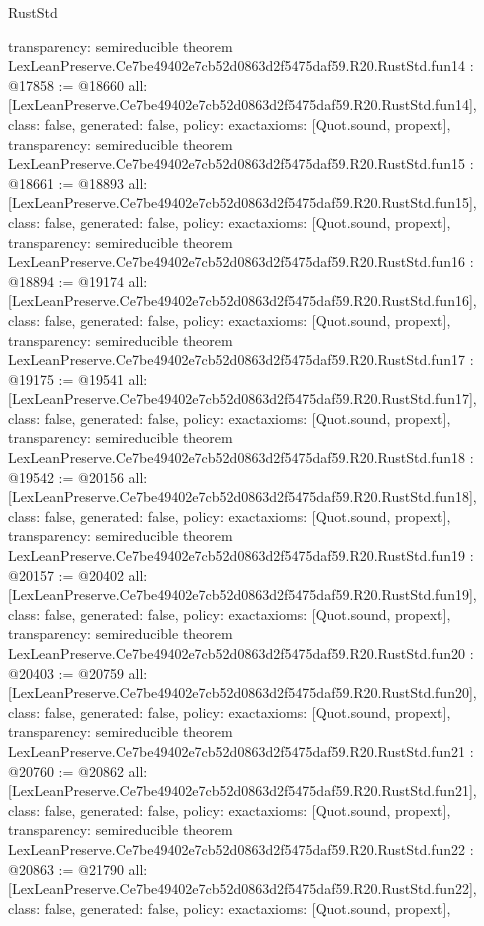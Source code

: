 \begin{lexlean}{RustStd}
\begin{coremodule}
{  transparency: semireducible
}
theorem LexLeanPreserve.Ce7be49402e7cb52d0863d2f5475daf59.R20.RustStd.fun14 : @17858 := @18660 {
  all: [LexLeanPreserve.Ce7be49402e7cb52d0863d2f5475daf59.R20.RustStd.fun14],
  class: false,
  generated: false,
  policy: exact{axioms: [Quot.sound, propext]},
  transparency: semireducible
}
theorem LexLeanPreserve.Ce7be49402e7cb52d0863d2f5475daf59.R20.RustStd.fun15 : @18661 := @18893 {
  all: [LexLeanPreserve.Ce7be49402e7cb52d0863d2f5475daf59.R20.RustStd.fun15],
  class: false,
  generated: false,
  policy: exact{axioms: [Quot.sound, propext]},
  transparency: semireducible
}
theorem LexLeanPreserve.Ce7be49402e7cb52d0863d2f5475daf59.R20.RustStd.fun16 : @18894 := @19174 {
  all: [LexLeanPreserve.Ce7be49402e7cb52d0863d2f5475daf59.R20.RustStd.fun16],
  class: false,
  generated: false,
  policy: exact{axioms: [Quot.sound, propext]},
  transparency: semireducible
}
theorem LexLeanPreserve.Ce7be49402e7cb52d0863d2f5475daf59.R20.RustStd.fun17 : @19175 := @19541 {
  all: [LexLeanPreserve.Ce7be49402e7cb52d0863d2f5475daf59.R20.RustStd.fun17],
  class: false,
  generated: false,
  policy: exact{axioms: [Quot.sound, propext]},
  transparency: semireducible
}
theorem LexLeanPreserve.Ce7be49402e7cb52d0863d2f5475daf59.R20.RustStd.fun18 : @19542 := @20156 {
  all: [LexLeanPreserve.Ce7be49402e7cb52d0863d2f5475daf59.R20.RustStd.fun18],
  class: false,
  generated: false,
  policy: exact{axioms: [Quot.sound, propext]},
  transparency: semireducible
}
theorem LexLeanPreserve.Ce7be49402e7cb52d0863d2f5475daf59.R20.RustStd.fun19 : @20157 := @20402 {
  all: [LexLeanPreserve.Ce7be49402e7cb52d0863d2f5475daf59.R20.RustStd.fun19],
  class: false,
  generated: false,
  policy: exact{axioms: [Quot.sound, propext]},
  transparency: semireducible
}
theorem LexLeanPreserve.Ce7be49402e7cb52d0863d2f5475daf59.R20.RustStd.fun20 : @20403 := @20759 {
  all: [LexLeanPreserve.Ce7be49402e7cb52d0863d2f5475daf59.R20.RustStd.fun20],
  class: false,
  generated: false,
  policy: exact{axioms: [Quot.sound, propext]},
  transparency: semireducible
}
theorem LexLeanPreserve.Ce7be49402e7cb52d0863d2f5475daf59.R20.RustStd.fun21 : @20760 := @20862 {
  all: [LexLeanPreserve.Ce7be49402e7cb52d0863d2f5475daf59.R20.RustStd.fun21],
  class: false,
  generated: false,
  policy: exact{axioms: [Quot.sound, propext]},
  transparency: semireducible
}
theorem LexLeanPreserve.Ce7be49402e7cb52d0863d2f5475daf59.R20.RustStd.fun22 : @20863 := @21790 {
  all: [LexLeanPreserve.Ce7be49402e7cb52d0863d2f5475daf59.R20.RustStd.fun22],
  class: false,
  generated: false,
  policy: exact{axioms: [Quot.sound, propext]},
}
\end{coremodule}
\end{lexlean}
